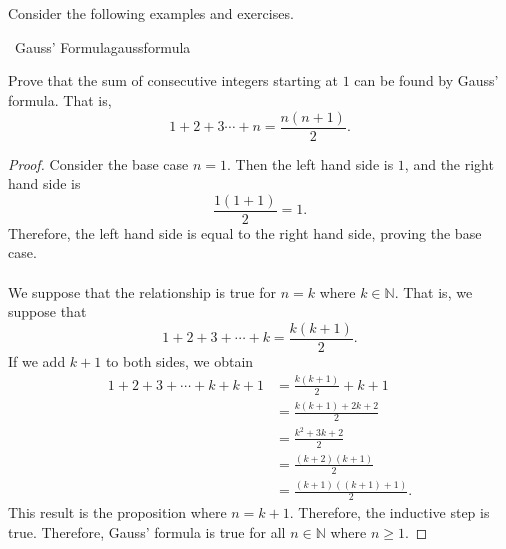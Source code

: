     \vphantom
    \\
    \\
    Consider the following examples and exercises.
    \begin{example}{\Difficulty\,\Difficulty\,\,Gauss' Formula}{gaussformula}
    
        Prove that the sum of consecutive integers starting at \(1\) can be found by Gauss' formula. That is,
        \begin{equation*}
            1+2+3\cdots+n=\frac{n(n+1)}{2}.
        \end{equation*}
        \begin{proof}
            Consider the base case \(n=1\). Then the left hand side is \(1\), and the right hand side is
            \begin{equation*}
                \frac{1(1+1)}{2}=1.
            \end{equation*}
            Therefore, the left hand side is equal to the right hand side, proving the base case.
            \\
            \\
            We suppose that the relationship is true for \(n=k\) where \(k\in\mathbb{N}\). That is, we suppose that
            \begin{equation*}
                1+2+3+\cdots+k=\frac{k(k+1)}{2}.
            \end{equation*}
            If we add \(k+1\) to both sides, we obtain
            \begin{align*}
                1+2+3+\cdots+k+k+1&=\frac{k(k+1)}{2}+k+1 \\
                &=\frac{k(k+1)+2k+2}{2} \\
                &=\frac{k^2+3k+2}{2} \\
                &=\frac{(k+2)(k+1)}{2} \\
                &=\frac{(k+1)((k+1)+1)}{2}.
            \end{align*}
            This result is the proposition where \(n=k+1\). Therefore, the inductive step is true. Therefore, Gauss' formula is true for all \(n\in\mathbb{N}\) where \(n \geq 1\).
        \end{proof}
    
    \end{example}
    \pagebreak
